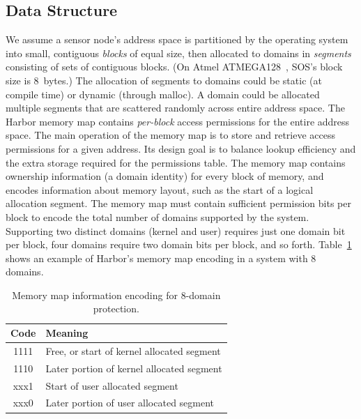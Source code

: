 \subsection{Data Structure}
%
We assume a sensor node's address space is partitioned by the operating
system into small, contiguous \emph{blocks} of equal size, then allocated
to domains in \textit{segments} consisting of sets of contiguous blocks.
%
(On Atmel ATMEGA128~\cite{avrdatasheet}, SOS's block size is 8~bytes.)
%
The allocation of segments to domains could be static (at compile
time) or dynamic (through malloc).
%
A domain could be allocated multiple segments that are scattered
randomly across entire address space.
%
The Harbor memory map contains \emph{per-block} access permissions for
the entire address space.
%
The main operation of the memory map is to store and retrieve access
permissions for a given address.
%
Its design goal is to balance lookup efficiency and the extra storage
required for the permissions table.
%
The memory map contains ownership information (a domain identity) for every
block of memory, and encodes information about memory layout, such as
the start of a logical allocation segment.
%
The memory map must contain sufficient permission bits per block to encode
the total number of domains supported by the system.
%
Supporting two distinct domains (kernel and user) requires just one
domain bit per block, four domains require two domain bits per block,
and so forth.
%
Table~\ref{tab:mmap_table} shows an example of Harbor's memory map encoding
in a system with 8 domains.
%
\begin{table}[htdp]
\centering
\small{
\begin{tabular}{|c|l|}
	\hline
	Code & Meaning\\
	\hline
	1111 & Free, or start of kernel allocated segment\\
	1110 & Later portion of kernel allocated segment\\
	xxx1 & Start of user allocated segment\\
	xxx0 & Later portion of user allocated segment\\
	\hline
\end{tabular}}
\caption{Memory map information encoding for 8-domain protection.}
\label{tab:mmap_table}
\end{table}

